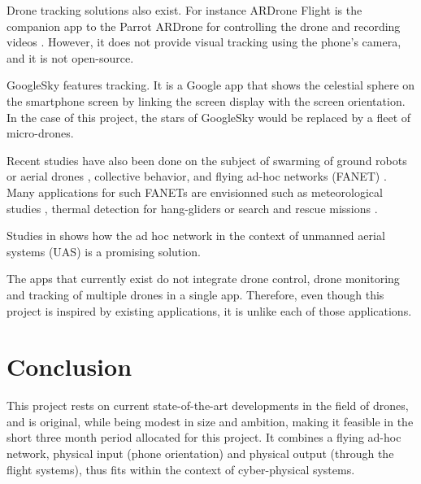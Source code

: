 \documentclass[10pt,letterpaper]{article}
\begin{document}
Drone tracking solutions also exist. For instance ARDrone Flight is the companion app to the Parrot ARDrone for controlling the drone and recording videos \cite{ARDroneFlight,ARDrone}. However, it does not provide visual tracking using the phone's camera, and it is not open-source. 

GoogleSky \cite{GoogleSky} features tracking. It is a Google app that shows  the celestial sphere on the smartphone screen by linking the screen display with the screen orientation. In the case of this project, the stars of GoogleSky would be replaced by a fleet of micro-drones. 

Recent studies have also been done on the subject of swarming of ground robots or aerial drones \cite{Vasarhelyi14}, collective behavior, and flying ad-hoc networks (FANET) \cite{VeyPRG14, RoyerPG13}. Many applications for such FANETs are envisionned such as meteorological studies  \cite{hattenberger13}, thermal detection for hang-gliders \cite{eckert2013flying} or search and rescue missions \cite{Cubber13}.

Studies in \cite{Abrassart14, bouachir14} shows how the ad hoc network in the context of unmanned aerial systems (UAS) is a promising solution.

The apps that currently exist do not integrate drone control, drone monitoring and tracking of multiple drones in a single app. Therefore, even though this project is inspired by existing applications, it is unlike each of those applications.

\section*{Conclusion}
This project rests on current state-of-the-art developments in the field of drones, and is original, while being modest in size and ambition, making it feasible in the short three month period allocated for this project. It combines a flying ad-hoc network, physical input (phone orientation) and physical output (through the flight systems), thus fits within the context of cyber-physical systems. 



\end{document}
